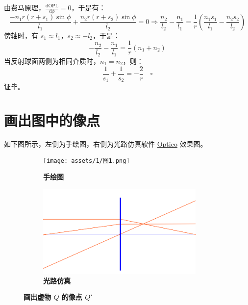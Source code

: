 \documentclass[UTF8]{report}
\theoremstyle{MyLineTheoremStyle} %
\theoremstyle{MyBlockTheoremStyle} %
\theoremstyle{MySubsubsectionStyle} %
\begin{document}
由费马原理，$\frac{\mathrm{d} \text{OPL}  }{\mathrm{d} \phi } = 0$，于是有：
\begin{equation}
\frac{-n_1r(r+s_1)\sin \phi }{l_1} + \frac{n_2r(r+s_2)\sin \phi }{l_2} = 0 
\Longrightarrow 
\frac{n_2}{l_2} - \frac{n_1}{l_1} = \frac{1}{r}\left( \frac{n_1s_1}{l_1} - \frac{n_2s_2}{l_2} \right)
\end{equation}
傍轴时，有 $s_1 \approx l_1$，$s_2 \approx -l_2$，于是：
\begin{equation}
-\frac{n_2}{l_2} - \frac{n_1}{l_1} = \frac{1}{r}(n_1 + n_2)
\end{equation}
当反射球面两侧为相同介质时，$n_1 = n_2$，则：
\begin{equation}
\frac{1}{s_1} + \frac{1}{s_2} = -\frac{2}{r}  \quad\square
\end{equation}
证毕。

\section{画出图中的像点}
如下图所示，左侧为手绘图，右侧为光路仿真软件 \href{https://www.optico.app/en/start-en/}{Optico} 效果图。

\begin{figure}[H]\centering
\begin{subfigure}[t]{0.47\textwidth}\centering
    \texttt{[image: assets/1/图1.png]}
    \caption{\bfseries 手绘图 }
\end{subfigure}\begin{subfigure}[t]{0.52\textwidth}\centering
    \includegraphics[height=130pt]{assets/1/1.png}
    \caption{\bfseries 光路仿真 }
\end{subfigure}
\caption{\bfseries 画出虚物 $Q$ 的像点 $Q'$}
\end{figure}
\end{document}
